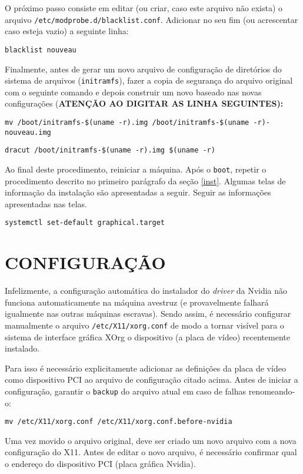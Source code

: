 \documentclass[twoside,a4paper,12pt,english]{inac17}
\begin{document}
O próximo passo consiste em editar (ou criar, caso este arquivo não exista) 
o arquivo \texttt{/etc/modprobe.d/blacklist.conf}. Adicionar no seu fim (ou 
acrescentar caso esteja vazio) a seguinte linha:

\texttt{blacklist nouveau}

Finalmente, antes de gerar um novo arquivo de configuração de diretórios 
do sistema de arquivos (\texttt{initramfs}), fazer a copia de segurança 
do arquivo original com o seguinte comando e depois construir um novo baseado nas novas configurações (\textbf{ATENÇÃO AO DIGITAR AS LINHA SEGUINTES):}

\texttt{mv /boot/initramfs-\$(uname -r).img /boot/initramfs-\$(uname -r)-nouveau.img}

\texttt{dracut /boot/initramfs-\$(uname -r).img \$(uname -r)}

Ao final deste procedimento, reiniciar a máquina. Após o \texttt{boot}, 
repetir o procedimento descrito no primeiro parágrafo da seção \ref{inst}. 
Algumas telas de informação da instalação são apresentadas a seguir. Seguir 
as informações apresentadas nas telas.


\texttt{systemctl set-default graphical.target}




\section{CONFIGURAÇÃO}

Infelizmente, a configuração automática do instalador do \textit{driver} da Nvidia 
não funciona automaticamente na máquina avestruz (e provavelmente falhará igualmente 
nas outras máquinas escravas). Sendo assim, é necessário configurar manualmente 
o arquivo \texttt{/etc/X11/xorg.conf} de modo a tornar visível para o sistema 
de interface gráfica XOrg o dispositivo (a placa de vídeo) recentemente instalado.

Para isso é necessário explicitamente adicionar as definições da placa de vídeo 
como dispositivo PCI ao arquivo de configuração citado acima. Antes de iniciar a 
configuração, garantir o \texttt{backup} do arquivo atual em caso de falhas renomeando-o:

\texttt{mv /etc/X11/xorg.conf /etc/X11/xorg.conf.before-nvidia}

Uma vez movido o arquivo original, deve ser criado um novo arquivo com a 
nova configuração do X11. Antes de editar o novo arquivo, é necessário 
confirmar qual o endereço do dispositivo PCI (placa gráfica Nvidia). 
\end{document}
